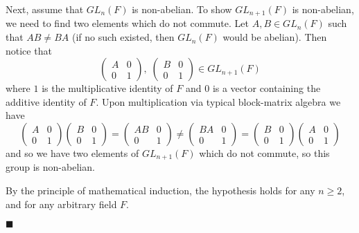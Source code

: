 \documentclass[12pt]{article}
\renewcommand{\qed}{\hfill$\blacksquare$}
\renewenvironment{proof}{\begin{addmargin}[1em]{0em}\begin{newproof}}{\end{newproof}\end{addmargin}\qed}
\begin{document}
\begin{proof}
Next, assume that $GL_n\left(F\right)$ is non-abelian. To show $GL_{n+1}\left(F\right)$ is non-abelian, we need to find two elements which do not commute. Let $A,B \in GL_{n}\left(F\right)$ such that $AB\neq BA$ (if no such existed, then $GL_{n}\left(F\right)$ would be abelian). Then notice that
$$ \left( \begin{array}{cc} A & 0 \\ 0 & 1 \end{array} \right), \; \left( \begin{array}{cc} B & 0 \\ 0 & 1 \end{array} \right) \in GL_{n+1}\left(F\right) $$ where $1$ is the multiplicative identity of $F$ and $0$ is a vector containing the additive identity of $F$. Upon multiplication via typical block-matrix algebra we have
$$ \left(\begin{array}{cc} A & 0 \\ 0 &  1 \end{array}\right)\left(\begin{array}{cc} B & 0 \\ 0 & 1 \end{array}\right) = \left(\begin{array}{cc} AB & 0 \\ 0 & 1 \end{array}\right) \neq \left(\begin{array}{cc} BA & 0 \\ 0 & 1 \end{array}\right) = \left(\begin{array}{cc} B & 0 \\ 0 & 1 \end{array}\right)\left(\begin{array}{cc} A & 0 \\ 0 & 1 \end{array}\right) $$ and so we have two elements of $GL_{n+1}\left(F\right)$ which do not commute, so this group is non-abelian.

By the principle of mathematical induction, the hypothesis holds for any $n\geq 2$, and for any arbitrary field $F$.
\end{proof}
\end{document}

